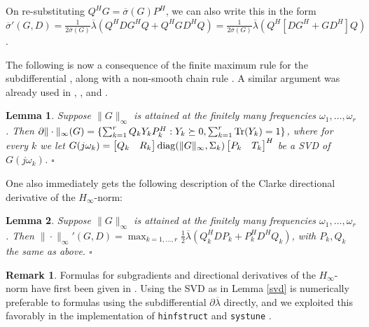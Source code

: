 \documentclass[12pt, a4paper,reqno]{amsart}
\newtheorem{lemma}{\bf Lemma}
\theoremstyle{definition}
\newtheorem{remark}{Remark}{\rm}
\begin{document}
On re-substituting $Q^HG = \overline{\sigma}(G)P^H$, we can also write this in the form
$\overline{\sigma}'(G,D) = \frac{1}{2 \overline{\sigma}(G)} \overline{\lambda}(Q^HDG^HQ + Q^HG D^HQ)
= \frac{1}{2 \overline{\sigma}(G)} \overline{\lambda}(Q^H   \left[DG^H + G D^H\right]Q)$. 


The following is now a consequence of the finite maximum rule for the subdifferential \cite[Prop. 2.3.12]{clarke1990optimization}, along with a non-smooth chain rule
\cite[Sect. 2.8]{clarke1990optimization}. 
A similar 
argument was already used in \cite[Sect. III]{apkarian2006nonsmooth}, \cite[Sect. 4 and 6]{an:05}, and \cite[Thm. 3.2]{apkarian2006nonsmooth2}.


\begin{lemma}
    Suppose $\|G\|_\infty$ is attained at the finitely many frequencies $\omega_1, \dots,\omega_r$. Then
    $\partial \|\cdot\|_\infty (G) = \{ \sum_{k=1}^r Q_k Y_k P_k^H: Y_k\succeq 0, \sum_{k=1}^r {\rm Tr}(Y_k)=1\}$, where for every $k$ we let
    $G(j\omega_k)=\begin{bmatrix} Q_k& R_k\end{bmatrix} {\rm diag}(\|G\|_\infty , \Sigma_k) \begin{bmatrix} P_k&T_k\end{bmatrix}^H$ be a SVD of 
    $G(j\omega_k)$.
    \hfill $\square$
\end{lemma}

One also immediately gets the following description of the Clarke directional derivative of the $H_\infty$-norm:

\begin{lemma}
Suppose $\|G\|_\infty$ is attained at the finitely many frequencies $\omega_1, \dots,\omega_r$. Then
$\|\cdot\|_\infty'(G,D) = \displaystyle\max_{k=1,\dots,r} \textstyle\frac{1}{2} \overline{\lambda}(Q_k^HDP_k+P_k^HD^HQ_k)$, 
with $P_k,Q_k$ the same as above.
\hfill $\square$
\end{lemma}









\begin{remark}
    Formulas for subgradients and directional derivatives of the $H_\infty$-norm have first been given in
    \cite{an:05,AN:2007,apkarian2006nonsmooth,apkarian2006nonsmooth2}. Using the SVD as in Lemma \ref{svd} is numerically preferable
    to formulas using the subdifferential $\partial \overline{\lambda}$ directly, and we  exploited this favorably in the 
    implementation of {\tt hinfstruct} and {\tt systune} \cite{MatlabRobust}.
\end{remark}
\end{document}
